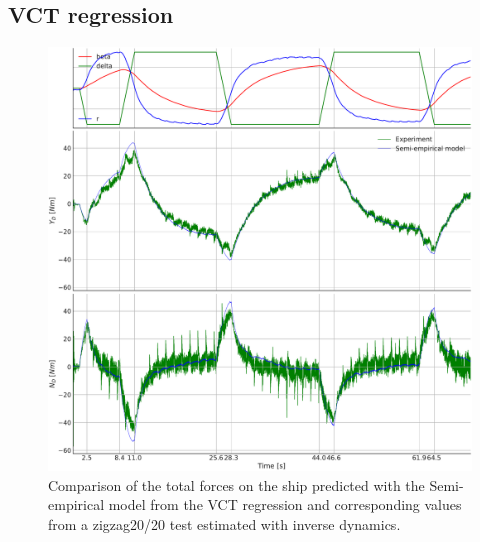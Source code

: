 \subsection{VCT regression}
\label{sec:result_VCT_regression}
\begin{figure}[h!]
    \includegraphics[width=\textwidth]{figures/result_VCT_regression.VCT_regression_ID.pdf}
    \caption{Comparison of the total forces on the ship predicted with the Semi-empirical model from the VCT regression and corresponding values from a zigzag20/20 test estimated with inverse dynamics.}
    \label{fig:VCT_regression_ID}
\end{figure}
